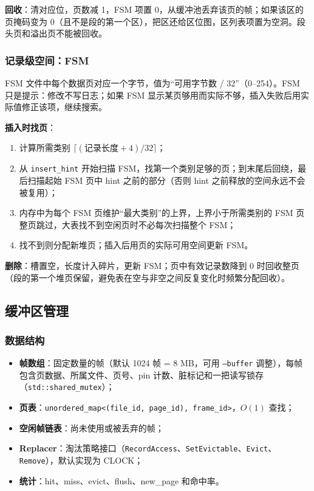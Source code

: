 \documentclass[11pt,a4paper]{ctexart}
\newcommand{\code}[1]{\texttt{#1}}
\begin{document}
\textbf{回收}：清对应位，页数减 1，FSM 项置 0，从缓冲池丢弃该页的帧；如果该区的页掩码变为 0（且不是段的第一个区），把区还给区位图，区列表项置为空洞。段头页和溢出页不能被回收。

\subsubsection{记录级空间：FSM}

FSM 文件中每个数据页对应一个字节，值为“可用字节数 / 32”（0–254）。FSM 只是提示：修改不写日志；如果 FSM 显示某页够用而实际不够，插入失败后用实际值修正该项，继续搜索。

\textbf{插入时找页}：
\begin{enumerate}
  \item 计算所需类别 $\lceil (\text{记录长度} + 4) / 32 \rceil$；
  \item 从 \code{insert\_hint} 开始扫描 FSM，找第一个类别足够的页；到末尾后回绕，最后扫描起始 FSM 页中 hint 之前的部分（否则 hint 之前释放的空间永远不会被复用）；
  \item 内存中为每个 FSM 页维护“最大类别”的上界，上界小于所需类别的 FSM 页整页跳过，大表找不到空闲页时不必每次扫描整个 FSM；
  \item 找不到则分配新堆页；插入后用页的实际可用空间更新 FSM。
\end{enumerate}

\textbf{删除}：槽置空，长度计入碎片，更新 FSM；页中有效记录数降到 0 时回收整页（段的第一个堆页保留，避免表在空与非空之间反复变化时频繁分配回收）。

\subsection{缓冲区管理}

\subsubsection{数据结构}

\begin{itemize}
  \item \textbf{帧数组}：固定数量的帧（默认 1024 帧 = 8 MB，可用 \code{--buffer} 调整），每帧包含页数据、所属文件、页号、pin 计数、脏标记和一把读写锁存（\code{std::shared\_mutex}）；
  \item \textbf{页表}：\code{unordered\_map<(file\_id, page\_id), frame\_id>}，$O(1)$ 查找；
  \item \textbf{空闲帧链表}：尚未使用或被丢弃的帧；
  \item \textbf{Replacer}：淘汰策略接口（\code{RecordAccess}、\code{SetEvictable}、\code{Evict}、\code{Remove}），默认实现为 CLOCK；
  \item \textbf{统计}：hit、miss、evict、flush、new\_page 和命中率。
\end{itemize}
\end{document}
